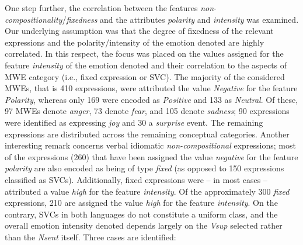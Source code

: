 \documentclass[output=paper]{langsci/langscibook}
\begin{document}
One step further, the correlation between the features
\textit{non}-\textit{compositionality}/\linebreak \textit{fixedness}
and the attributes \textit{polarity} and
\textit{intensity} was examined. Our underlying assumption
was that the degree of fixedness of the relevant expressions and the
polarity/intensity of the emotion denoted are highly correlated. In
this respect, the focus was placed on the values assigned for the
feature \textit{intensity} of the emotion denoted and their correlation to the
aspects of MWE category (i.e., fixed expression or SVC). The majority
of the considered  MWEs, that is 410 expressions, were attributed the
value \textit{Negative} for the feature \textit{Polarity},
whereas only 169 were encoded as \textit{Positive} and 133
as \textit{Neutral}. Of these, 97 MWEs denote
\textit{anger}, 73 denote \textit{fear}, and 105
denote \textit{sadness}; 90 expressions were identified as
expressing \textit{joy} and 30 a
\textit{surprise} event. The remaining expressions are
distributed across the remaining conceptual categories. Another
interesting remark concerns verbal idiomatic \textit{non-compositional}
expressions; most of the expressions (260) that have been assigned the
value \textit{negative} for the feature
\textit{polarity} are also encoded as being of type
\textit{fixed} (as opposed to 150 expressions classified as
SVCs). Additionally, fixed expressions were – in most cases –
attributed a value \textit{high} for the feature\textit{
intensity}. Of the approximately 300 \textit{fixed }expressions, 210 are
assigned the value \textit{high }for the feature \textit{intensity}. On
the contrary, SVCs in both languages do not constitute a uniform class,
and the overall emotion intensity denoted depends largely on the
\textit{Vsup} selected rather than the \textit{Nsent }itself. Three
cases are identified:
\end{document}

